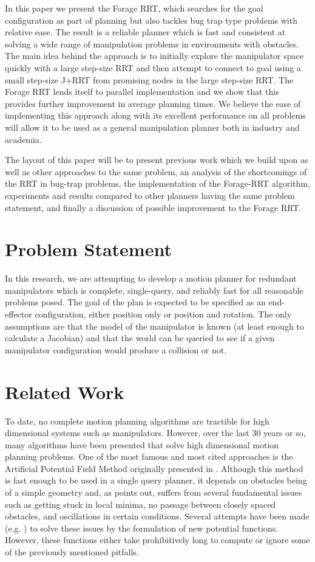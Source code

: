\documentclass[conference]{IEEEtran}
\begin{document}
In this paper we present the Forage RRT, which searches for the goal configuration as part of planning but also tackles bug trap type
problems with relative ease. The result is a reliable planner which is fast and consistent at solving a wide range of manipulation problems
in environments with obstacles. The main idea behind the approach is to initially explore the manipulator space quickly with a large
step-size RRT and then attempt to connect to goal using a small step-size J+RRT from promising nodes in the large step-size RRT. The
Forage RRT lends itself to parallel implementation and we show that this provides further improvement in average planning times. We believe
the ease of implementing this approach along with its excellent performance on all problems will allow it to be used as a general
manipulation planner both in industry and academia.

The layout of this paper will be to present previous work which we build upon as well as other approaches to the same problem, an analysis
of the shortcomings of the RRT in bug-trap problems, the implementation of the Forage-RRT algorithm, experiments and results compared to
other planners having the same problem statement, and finally a discussion of possible improvement to the Forage RRT.  

\section{Problem Statement}
In this research, we are attempting to develop a motion planner for redundant manipulators which is complete, single-query, and reliably
fast for all reasonable problems posed. The goal of the plan is expected to be specified as an end-effector configuration, either position
only or position and rotation. The only assumptions are that the model of the manipulator is known (at least enough to calculate a
Jacobian) and that the world can be queried to see if a given manipulator configuration would produce a collision or not.

\section{Related Work}
To date, no complete motion planning algorithms are tractible for high dimensional systems such as manipulators. However, over the last 30
years or so, many algorithms have been presented that solve high dimensional motion planning problems. One of the most famous and most cited
approaches is the Artificial Potential Field Method originally presented in \cite{khatib86}. Although this method is fast enough to be
used in a single query planner, it depends on obstacles being of a simple geometry and, as \cite{koren91} points out, suffers from several
fundamental issues such as getting stuck in local minima, no passage between closely spaced obstacles, and oscillations in certain
conditions. Several attempts have been made (e.g. \cite{connolly90} \cite{ge00}) to solve these issues by the formulation of new potential
functions. However, these functions either take prohibitively long to compute or ignore some of the previously mentioned pitfalls. 
\end{document}

